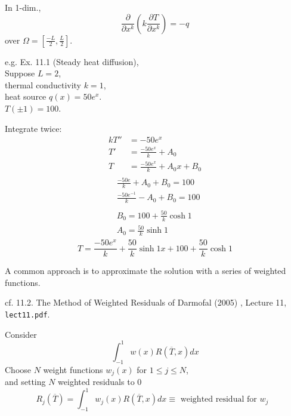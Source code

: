 \documentclass[10pt]{amsart}
\begin{document}
\begin{multicols*}{2}
In 1-dim.,
\[
\frac{ \partial }{ \partial x^k} \left( k \frac{ \partial T}{ \partial x^k} \right) = -q
\]
over $\Omega = \left[ \frac{-L}{2}, \frac{L}{2} \right]$.  

e.g. Ex. 11.1 (Steady heat diffusion), \\
Suppose $L=2$, \\
thermal conductivity $k=1$, \\
heat source $q(x) = 50e^x$.  \\
$T(\pm 1) = 100$.

Integrate twice:
\[
\begin{aligned}
  kT'' & = -50 e^x \\ 
T' & = \frac{-50 e^x}{k} + A_0 \\ 
 T & = \frac{ -50 e^x}{k} + A_0x + B_0
\end{aligned}
\]
\[
\begin{gathered}
\begin{aligned}
  & \frac{-50 e}{k} + A_0 + B_0 = 100 \\ 
  & \frac{-50 e^{-1}}{k} - A_0 + B_0 = 100 
  \end{aligned} \\ 
\begin{aligned}
  & B_0 = 100 + \frac{50}{k} \cosh{1} \\ 
  & A_0 = \frac{50}{k} \sinh{1}
  \end{aligned}
\end{gathered}
\]
\[
T= \frac{-50 e^x }{k} + \frac{50}{k} \sinh{1} x + 100 + \frac{50}{k} \cosh{1}
\]

A common approach is to approximate the solution with a series of weighted functions.




cf. 11.2. The Method of Weighted Residuals of Darmofal (2005) \cite{Darm2005}, Lecture 11, \verb|lect11.pdf|.

Consider
\[
\int_{-1}^1 w(x) R(\overline{T},x)dx
\]
Choose $N$ weight functions $w_j(x)$ for $1\leq j \leq N$, \\
and setting $N$ weighted residuals to $0$
\begin{equation}
R_j(\overline{T}) = \int_{-1}^1 w_j(x) R(\overline{T},x)dx \equiv \text{ weighted residual for $w_j$ }
  \end{equation}


\end{multicols*}
\end{document}
